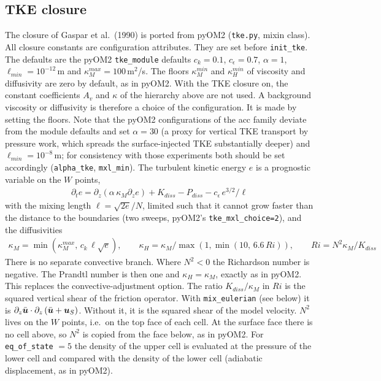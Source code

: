 \documentclass[12pt]{article}
\newcommand{\beq}  { \begin{eqnarray} }
\newcommand{\eeq}  { \end{eqnarray}}
\renewcommand{\v}[1]{{\mbox{\boldmath$ #1 $}}}  %
\newcommand{\pt}[1]{{\partial_t #1}}
\newcommand{\pz}[1]{{\partial_z #1}}
\newcommand{\lk}{\left(}
\newcommand{\rk}{\right)}
\begin{document}
\subsection*{TKE closure}

The closure of Gaspar et al.\ (1990) is ported from pyOM2
(\verb|tke.py|, mixin class). All closure constants are configuration
attributes. They are set before \verb|init_tke|.
The defaults are the pyOM2 \verb|tke_module| defaults $c_k = 0.1$, $c_\epsilon = 0.7$, $\alpha = 1$,
$\ell_{min} = 10^{-12}\,$m and $\kappa_M^{max} = 100\,$m$^2$/s.
The floors $\kappa_M^{min}$ and $\kappa_H^{min}$ of viscosity and diffusivity are zero by default, as in pyOM2.
With the TKE closure on, the constant coefficients $A_v$ and $\kappa$ of the hierarchy above are not used.
A background viscosity or diffusivity is therefore a choice of the configuration.
It is made by setting the floors. Note that the
pyOM2 configurations of the acc family deviate from the module defaults and
set $\alpha = 30$ (a proxy for vertical TKE transport by pressure work,
which spreads the surface-injected TKE substantially deeper) and
$\ell_{min} = 10^{-8}\,$m; for consistency with those experiments both
should be set accordingly (\verb|alpha_tke|, \verb|mxl_min|). The turbulent
kinetic energy $e$ is a prognostic variable on the $W$ points,
\beq
 \pt e = \pz{} \lk \alpha\, \kappa_M \pz e \rk
 + K_{diss} - P_{diss} - c_\epsilon\, e^{3/2} / \ell
\eeq
with the mixing length $\ell = \sqrt{2 e}/N$, limited such that it cannot
grow faster than the distance to the boundaries (two sweeps, pyOM2's
\verb|tke_mxl_choice=2|), and the diffusivities
\beq
 \kappa_M = \min( \kappa_M^{max},\, c_k\, \ell \sqrt{e} ), \qquad
 \kappa_H = \kappa_M / \max(1, \min(10,\, 6.6\, Ri)), \qquad
 Ri = N^2 \kappa_M / K_{diss}
\eeq
There is no separate convective branch.
Where $N^2 < 0$ the Richardson number is negative.
The Prandtl number is then one and $\kappa_H = \kappa_M$, exactly as in pyOM2.
This replaces the convective-adjustment option.
The ratio $K_{diss}/\kappa_M$ in $Ri$ is the squared vertical shear of the friction operator.
With \verb|mix_eulerian| (see below) it is $\pz{\bar{\v u}} \cdot \pz{} \lk \bar{\v u} + \v u_S \rk$.
Without it, it is the squared shear of the model velocity.
$N^2$ lives on the $W$ points, i.e.\ on the top face of each cell.
At the surface face there is no cell above, so $N^2$ is copied from the face below, as in pyOM2.
For \verb|eq_of_state| $=5$ the density of the upper cell is evaluated at the pressure of the
lower cell and compared with the density of the lower cell (adiabatic displacement, as in pyOM2).
\end{document}
